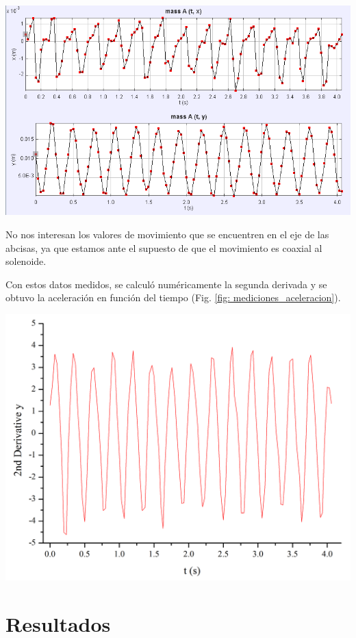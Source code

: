 \documentclass[a4paper,12pt]{article}
\newenvironment{Figure}
    {\par\medskip\noindent\minipage{\linewidth}}
    {\endminipage\par\medskip}
\begin{document}
        \begin{Figure}
            \centering

            \includegraphics[width=0.6\linewidth]{mediciones_movimientoLineal.png}
            \label{fig: mediciones_movimientoLineal}
        \end{Figure}

        No nos interesan los valores de movimiento que se encuentren en el eje de las abcisas, ya que estamos ante el supuesto de que el movimiento es coaxial al solenoide.

        Con estos datos medidos, se calculó numéricamente la segunda derivada y se obtuvo la aceleración en función del tiempo (Fig. \ref{fig: mediciones_aceleracion}).

        \begin{Figure}
            \centering

            \includegraphics[width=0.6\linewidth]{mediciones_aceleracion.png}
            \label{fig: mediciones_aceleracion}
        \end{Figure}

\section*{Resultados}
\end{document}
